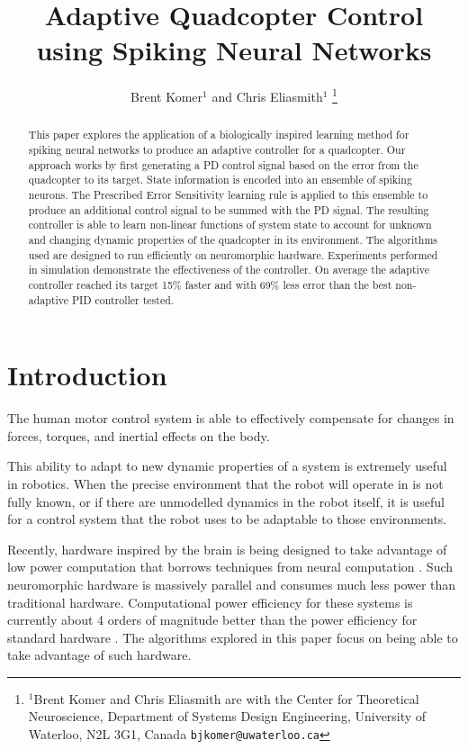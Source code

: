 \documentclass[letterpaper, 10 pt, conference]{ieeeconf}  %
\title{\LARGE \bf
Adaptive Quadcopter Control using Spiking Neural Networks
}
\author{Brent Komer$^{1}$ and Chris Eliasmith$^{1}$%
\thanks{$^{1}$Brent Komer and Chris Eliasmith are with the Center for Theoretical Neuroscience, Department of Systems Design Engineering,
        University of Waterloo, N2L 3G1, Canada
        {\tt\small bjkomer@uwaterloo.ca}}%
}
\begin{document}
\maketitle
\thispagestyle{empty}
\pagestyle{empty}


\begin{abstract}

This paper explores the application of a biologically inspired learning method for spiking neural networks to produce an adaptive controller for a quadcopter.
Our approach works by first generating a PD control signal based on the error from the quadcopter to its target.
State information is encoded into an ensemble of spiking neurons.
The Prescribed Error Sensitivity learning rule is applied to this ensemble to produce an additional control signal to be summed with the PD signal.
The resulting controller is able to learn non-linear functions of system state to account for unknown and changing dynamic properties of the quadcopter in its environment.
The algorithms used are designed to run efficiently on neuromorphic hardware.
Experiments performed in simulation demonstrate the effectiveness of the controller.
On average the adaptive controller reached its target 15\% faster and with 69\% less error than the best non-adaptive PID controller tested.


\end{abstract}


\section{Introduction}

The human motor control system is able to effectively compensate for changes in forces, torques, and inertial effects on the body.

This ability to adapt to new dynamic properties of a system is extremely useful in robotics.
When the precise environment that the robot will operate in is not fully known, or if there are unmodelled dynamics in the robot itself, it is useful for a control system that the robot uses to be adaptable to those environments.

Recently, hardware inspired by the brain is being designed to take advantage of low power computation that borrows techniques from neural computation \cite{hasler2013finding, khan2008spinnaker, boahen2006neurogrid}. %
Such neuromorphic hardware is massively parallel and consumes much less power than traditional hardware.
Computational power efficiency for these systems is currently about 4 orders of magnitude better than the power efficiency for standard hardware \cite{hasler2013finding}.
The algorithms explored in this paper focus on being able to take advantage of such hardware.
\end{document}

